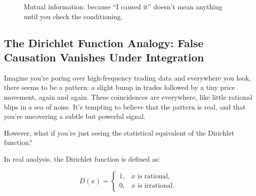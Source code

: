 \begin{figure}[H]
\centering
{}
\caption{Mutual information: because “I caused it” doesn’t mean anything until you check the conditioning.}
\end{figure}




\subsection{The Dirichlet Function Analogy: False Causation Vanishes Under Integration}

\vspace{0.5em}
\noindent

Imagine you're poring over high-frequency trading data and everywhere you look, there seems to be a pattern: a slight bump in trades followed by a tiny price movement, again and again. These coincidences are everywhere, like little rational blips in a sea of noise. It's tempting to believe that the pattern is real, and that you're uncovering a subtle but powerful signal.

However, what if you're just seeing the statistical equivalent of the Dirichlet function?

In real analysis, the Dirichlet function is defined as:

\[
D(x) =
\begin{cases}
1, & x \text{ is rational}, \\
0, & x \text{ is irrational}.
\end{cases}
\]

